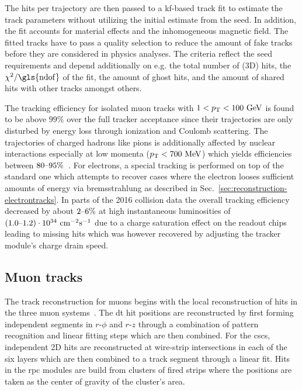 The hits per trajectory are then passed to a \gls{kf}-based track fit to estimate the track parameters without utilizing the initial estimate from the seed. In addition, the fit accounts for material effects and the inhomogeneous magnetic field.  The fitted tracks have to pass a quality selection to reduce the amount of fake tracks before they are considered in physics analyses. The criteria reflect the seed requirements and depend additionally on e.g. the total number of (3D) hits, the $\chi^2/\mathrm{\gls{ndof}}$ of the fit, the amount of ghost hits, and the amount of shared hits with other tracks amongst others.

The tracking efficiency for isolated muon tracks with $1<p_\mathrm{T}<100~\mathrm{GeV}$ is found to be above $99\%$ over the full tracker acceptance since their trajectories are only disturbed by energy loss through ionization and Coulomb scattering. The trajectories of charged hadrons like pions is additionally affected by nuclear interactions especially at low momenta ($p_\mathrm{T}<700~\mathrm{MeV}$) which yields efficiencies between $80\text{--}95\%$~\cite{Chatrchyan:2014fea}. For electrons, a special tracking is performed on top of the standard one which attempts to recover cases where the electron looses sufficient amounts of energy via bremsstrahlung as described in Sec.~\ref{sec:reconstruction-electrontracks}. In parts of the 2016 collision data the overall tracking efficiency decreased by about $2\text{--}6\%$ at high instantaneous luminosities of $(1.0\text{--}1.2)\cdot10^{34}~\mathrm{cm}^{-2}\mathrm{s}^{-1}$ due to a charge saturation effect on the readout chips leading to missing hits which was however recovered by adjusting the tracker module's charge drain speed.

\subsection{Muon tracks}
\label{sec:reconstruction-muontracks}

The track reconstruction for muons begins with the local reconstruction of hits in the three muon systems~\cite{Bayatian:922757}. The \gls{dt} hit positions are reconstructed by first forming independent segments in $r\text{-}\phi$ and $r\text{-}z$ through a combination of pattern recognition and linear fitting steps which are then combined. For the \glspl{csc}, independent 2D hits are reconstructed at wire-strip intersections in each of the six layers which are then combined to a track segment through a linear fit. Hits in the \gls{rpc} modules are build from clusters of fired strips where the positions are taken as the center of gravity of the cluster's area.

